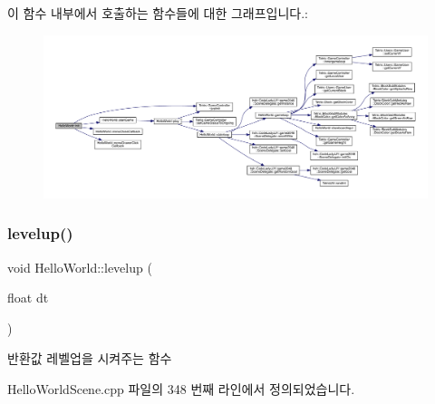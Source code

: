 이 함수 내부에서 호출하는 함수들에 대한 그래프입니다.\+:
\nopagebreak
\begin{figure}[H]
\begin{center}
\leavevmode
\includegraphics[width=350pt]{d9/d98/class_hello_world_a65e2b1525051f3690e5a39ca56608a97_cgraph}
\end{center}
\end{figure}
\mbox{\label{class_hello_world_af1590254503ba391a084d767df2dd858}} 
\subsubsection{\texorpdfstring{levelup()}{levelup()}}
{\footnotesize\ttfamily void Hello\+World\+::levelup (\begin{DoxyParamCaption}\item[{float}]{dt }\end{DoxyParamCaption})\hspace{0.3cm}{\ttfamily [protected]}}

\begin{DoxyReturn}{반환값}
레벨업을 시켜주는 함수 
\end{DoxyReturn}


Hello\+World\+Scene.\+cpp 파일의 348 번째 라인에서 정의되었습니다.


